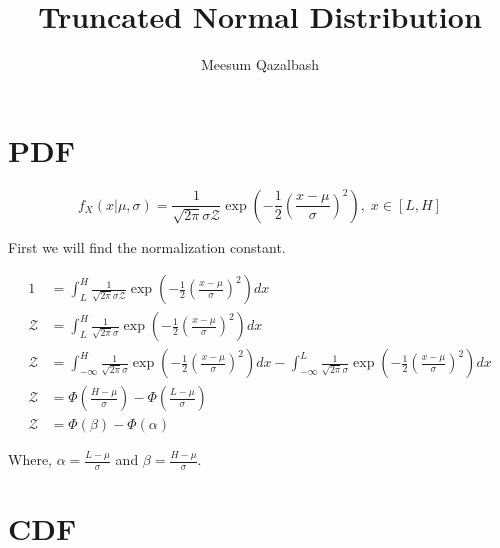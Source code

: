 \documentclass{article}
\title{Truncated Normal Distribution}
\author{Meesum Qazalbash}
\newcommand{\Z}{\mathcal{Z}}
\newcommand{\ncdf}[1]{\Phi\left(#1\right)}
\begin{document}
\maketitle

\section{PDF}

\begin{equation}
    f_X(x|\mu,\sigma) = \frac{1}{\sqrt{2\pi}\sigma\Z}\exp{\left(-\frac{1}{2}\left(\frac{x-\mu}{\sigma}\right)^{2}\right)},\; x \in [L,H]
\end{equation}

First we will find the normalization constant.

\begin{align}
    1  & =\int_{L}^{H}\frac{1}{\sqrt{2\pi}\sigma\Z}\exp{\left(-\frac{1}{2}\left(\frac{x-\mu}{\sigma}\right)^{2}\right)}dx                                                                                                                          \\
    \Z & = \int_{L}^{H}\frac{1}{\sqrt{2\pi}\sigma}\exp{\left(-\frac{1}{2}\left(\frac{x-\mu}{\sigma}\right)^{2}\right)}dx                                                                                                                           \\
    \Z & = \int_{-\infty}^{H}\frac{1}{\sqrt{2\pi}\sigma}\exp{\left(-\frac{1}{2}\left(\frac{x-\mu}{\sigma}\right)^{2}\right)}dx-\int_{-\infty}^{L}\frac{1}{\sqrt{2\pi}\sigma}\exp{\left(-\frac{1}{2}\left(\frac{x-\mu}{\sigma}\right)^{2}\right)}dx \\
    \Z & = \ncdf{\frac{H-\mu}{\sigma}}-\ncdf{\frac{L-\mu}{\sigma}}                                                                                                                                                                                 \\
    \Z & = \ncdf{\beta}-\ncdf{\alpha}
\end{align}

Where, \(\displaystyle\alpha=\frac{L-\mu}{\sigma}\) and \(\displaystyle\beta=\frac{H-\mu}{\sigma}\).

\section{CDF}
\end{document}
